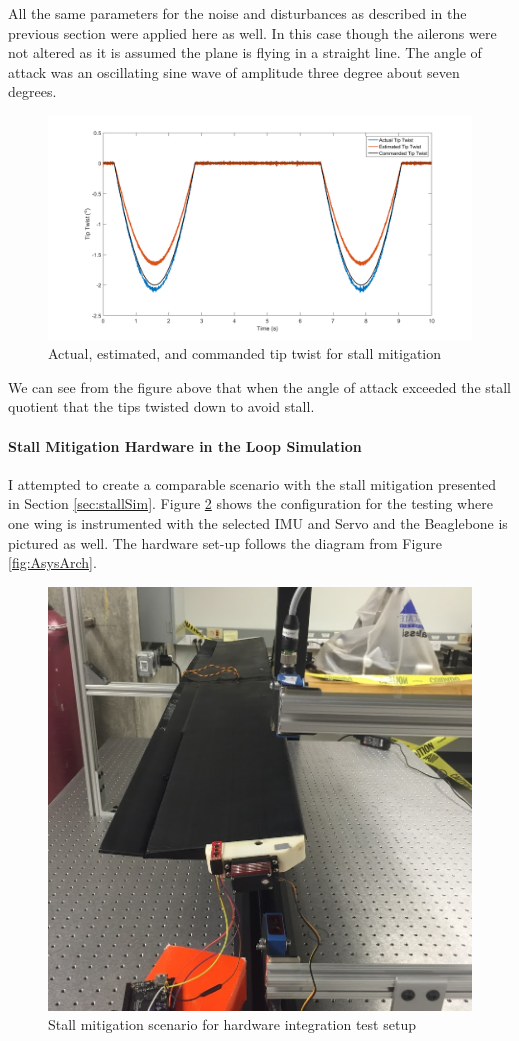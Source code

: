 \documentclass[11pt]{ucthesis}
\begin{document}
All the same parameters for the noise and disturbances as described in the previous section were applied here as well. In this case though the ailerons were not altered as it is assumed the plane is flying in a straight line. The angle of attack was an oscillating sine wave of amplitude three degree about seven degrees.

\begin{figure}[h]
\centering
\includegraphics[width=1\linewidth]{Figures/StallMitigationTipTwist.png}
\caption{Actual, estimated, and commanded tip twist for stall mitigation}
\label{fig:APStall}
\end{figure}

We can see from the figure above that when the angle of attack exceeded the stall quotient that the tips twisted down to avoid stall.

\paragraph{Stall Mitigation Hardware in the Loop Simulation}


I attempted to create a comparable scenario with the stall mitigation presented in Section \ref{sec:stallSim}. Figure \ref{fig:APHilSimStall} shows the configuration for the testing where one wing is instrumented with the selected IMU and Servo and the Beaglebone is pictured as well. The hardware set-up follows the diagram from Figure \ref{fig:AsysArch}.

\begin{figure}[h]
\centering
\includegraphics[width=0.5\linewidth]{Figures/IntegrationBenchtopTestingSetup.jpg}
\caption{Stall mitigation scenario for hardware integration test setup}
\label{fig:APHilSimStall}
\end{figure}
\end{document}
